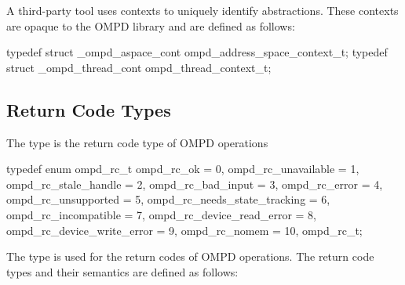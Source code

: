 \summary
A third-party tool uses contexts to uniquely identify abstractions. These 
contexts are opaque to the OMPD library and are defined as follows:

\format
\begin{ccppspecific}
\begin{ompSyntax}
typedef struct _ompd_aspace_cont ompd_address_space_context_t;
typedef struct _ompd_thread_cont ompd_thread_context_t;
\end{ompSyntax}
\end{ccppspecific}



\subsection{Return Code Types}
\label{subsubsec:ompd_rc_t}

\summary
The  type is the return code type of OMPD operations

\format
\begin{ccppspecific}
\begin{ompSyntax}
typedef enum ompd_rc_t {
  ompd_rc_ok = 0,
  ompd_rc_unavailable = 1,
  ompd_rc_stale_handle = 2,
  ompd_rc_bad_input = 3,
  ompd_rc_error = 4,
  ompd_rc_unsupported = 5,
  ompd_rc_needs_state_tracking = 6,
  ompd_rc_incompatible = 7,
  ompd_rc_device_read_error = 8,
  ompd_rc_device_write_error = 9,
  ompd_rc_nomem = 10,
} ompd_rc_t;
\end{ompSyntax}
\end{ccppspecific}


\descr
The  type is used for the return codes of OMPD operations. 
The return code types and their semantics are defined as follows:

